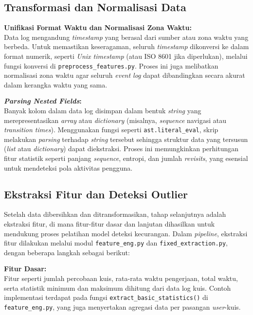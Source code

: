 \subsection{Transformasi dan Normalisasi Data}
\label{sec:transformasiNormalisasiData}
\textbf{Unifikasi Format Waktu dan Normalisasi Zona Waktu:} \\
Data log mengandung \textit{timestamp} yang berasal dari sumber atau zona waktu yang berbeda. Untuk memastikan keseragaman, seluruh \textit{timestamp} dikonversi ke dalam format numerik, seperti \textit{Unix timestamp} (atau ISO 8601 jika diperlukan), melalui fungsi konversi di \texttt{preprocess\_features.py}. Proses ini juga melibatkan normalisasi zona waktu agar seluruh \textit{event log} dapat dibandingkan secara akurat dalam kerangka waktu yang sama.

\textbf{\textit{Parsing Nested Fields}:} \\
Banyak kolom dalam data log disimpan dalam bentuk \textit{string} yang merepresentasikan \textit{array} atau \textit{dictionary} (misalnya, \textit{sequence} navigasi atau \textit{transition times}). Menggunakan fungsi seperti \texttt{ast.literal\_eval}, skrip melakukan \textit{parsing} terhadap \textit{string} tersebut sehingga struktur data yang tersusun (\textit{list} atau \textit{dictionary}) dapat diekstraksi. Proses ini memungkinkan perhitungan fitur statistik seperti panjang \textit{sequence}, entropi, dan jumlah \textit{revisits}, yang esensial untuk mendeteksi pola aktivitas pengguna.

\subsection{Ekstraksi Fitur dan Deteksi Outlier}
\label{sec:ekstraksiFiturDeteksiOutlier}
Setelah data dibersihkan dan ditransformasikan, tahap selanjutnya adalah ekstraksi fitur, di mana fitur-fitur dasar dan lanjutan dihasilkan untuk mendukung proses pelatihan model deteksi kecurangan. Dalam \textit{pipeline}, ekstraksi fitur dilakukan melalui modul \texttt{feature\_eng.py} dan \texttt{fixed\_extraction.py}, dengan beberapa langkah sebagai berikut:

\textbf{Fitur Dasar:} \\
Fitur seperti jumlah percobaan kuis, rata-rata waktu pengerjaan, total waktu, serta statistik minimum dan maksimum dihitung dari data log kuis. Contoh implementasi terdapat pada fungsi \texttt{extract\_basic\_statistics()} di \texttt{feature\_eng.py}, yang juga menyertakan agregasi data per pasangan \textit{user}-kuis.

